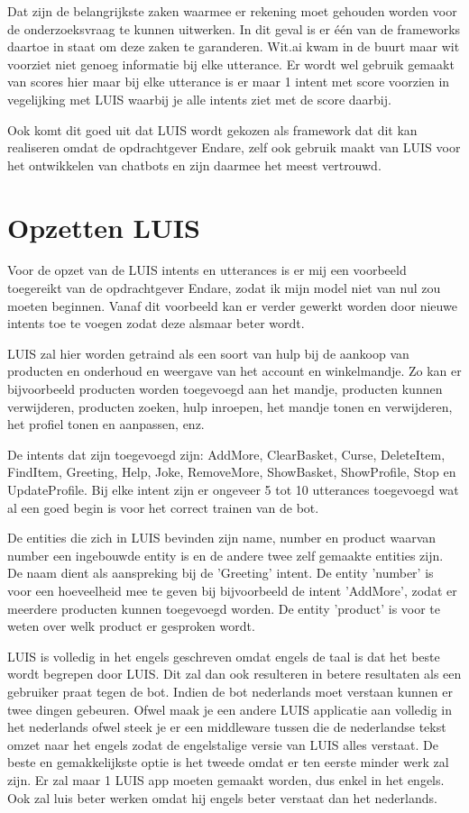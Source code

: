 Dat zijn de belangrijkste zaken waarmee er rekening moet gehouden worden voor de onderzoeksvraag te kunnen uitwerken. In dit geval is er één van de frameworks daartoe in staat om deze zaken te garanderen. Wit.ai kwam in de buurt maar wit voorziet niet genoeg informatie bij elke utterance. Er wordt wel gebruik gemaakt van scores hier maar bij elke utterance is er maar 1 intent met score voorzien in vegelijking met LUIS waarbij je alle intents ziet met de score daarbij.

Ook komt dit goed uit dat LUIS wordt gekozen als framework dat dit kan realiseren omdat de opdrachtgever Endare, zelf ook gebruik maakt van LUIS voor het ontwikkelen van chatbots en zijn daarmee het meest vertrouwd.

\section{Opzetten LUIS}
\label{sec:opzet}

Voor de opzet van de LUIS intents en utterances is er mij een voorbeeld toegereikt van de opdrachtgever Endare, zodat ik mijn model niet van nul zou moeten beginnen. Vanaf dit voorbeeld kan er verder gewerkt worden door nieuwe intents toe te voegen zodat deze alsmaar beter wordt.

LUIS zal hier worden getraind als een soort van hulp bij de aankoop van producten en onderhoud en weergave van het account en winkelmandje. Zo kan er bijvoorbeeld producten worden toegevoegd aan het mandje, producten kunnen verwijderen, producten zoeken, hulp inroepen, het mandje tonen en verwijderen, het profiel tonen en aanpassen, enz.

De intents dat zijn toegevoegd zijn: AddMore, ClearBasket, Curse, DeleteItem, FindItem, Greeting, Help, Joke, RemoveMore, ShowBasket, ShowProfile, Stop en UpdateProfile. Bij elke intent zijn er ongeveer 5 tot 10 utterances toegevoegd wat al een goed begin is voor het correct trainen van de bot.

De entities die zich in LUIS bevinden zijn name, number en product waarvan number een ingebouwde entity is en de andere twee zelf gemaakte entities zijn. De naam dient als aanspreking bij de 'Greeting' intent. De entity 'number' is voor een hoeveelheid mee te geven bij bijvoorbeeld de intent 'AddMore', zodat er meerdere producten kunnen toegevoegd worden. De entity 'product' is voor te weten over welk product er gesproken wordt.

LUIS is volledig in het engels geschreven omdat engels de taal is dat het beste wordt begrepen door LUIS. Dit zal dan ook resulteren in betere resultaten als een gebruiker praat tegen de bot. Indien de bot nederlands moet verstaan kunnen er twee dingen gebeuren. Ofwel maak je een andere LUIS applicatie aan volledig in het nederlands ofwel steek je er een middleware tussen die de nederlandse tekst omzet naar het engels zodat de engelstalige versie van LUIS alles verstaat. De beste en gemakkelijkste optie is het tweede omdat er ten eerste minder werk zal zijn. Er zal maar 1 LUIS app moeten gemaakt worden, dus enkel in het engels. Ook zal luis beter werken omdat hij engels beter verstaat dan het nederlands.

